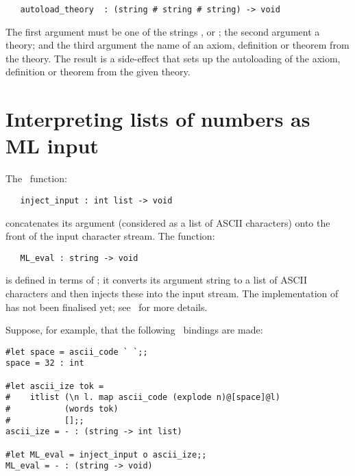 \begin{boxed}
\begin{verbatim}
   autoload_theory  : (string # string # string) -> void
\end{verbatim}\end{boxed}

The first argument must be one of the strings , 
or ; the second argument a theory; and the third argument the
name of an axiom, definition or theorem from the theory. The result is a
side-effect that sets up the autoloading of the axiom, definition or theorem
from the given theory.



\section{Interpreting lists of numbers as ML input}

The \ML\ function:

\begin{boxed}
\begin{verbatim}
   inject_input : int list -> void
\end{verbatim}\end{boxed}

\noindent concatenates its argument (considered as a list of {\small ASCII}
characters) onto the front of the input character stream. The function:

\begin{boxed}
\begin{verbatim}
   ML_eval : string -> void
\end{verbatim}\end{boxed}

\noindent is defined in terms of ; it converts its argument
string to a list of {\small ASCII} characters and then injects these into the
input stream. The implementation of  has not been finalised yet;
see \REFERENCE\ for more details.

Suppose, for example, that the following \ML\ bindings are made:

\setcounter{sessioncount}{1}

\begin{session}\begin{verbatim}
#let space = ascii_code ` `;;
space = 32 : int

#let ascii_ize tok =
#    itlist (\n l. map ascii_code (explode n)@[space]@l)
#           (words tok)
#           [];;
ascii_ize = - : (string -> int list)

#let ML_eval = inject_input o ascii_ize;;
ML_eval = - : (string -> void)
\end{verbatim}\end{session}

